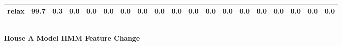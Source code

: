 \documentclass{article}
\begin{document}
\begin{sideways}
\begin{tabular}{lrrrrrrrrrrrrrrrrrr}
relax                         &        99.7 &                0.3 &           0.0 &                          0.0 &                0.0 &                0.0 &                        0.0 &          0.0 &              0.0 &                0.0 &                    0.0 &                      0.0 &                  0.0 &                   0.0 &              0.0 &              0.0 &                                  0.0 &          0.0 \\
\bottomrule
\end{tabular}
\end{sideways}
\normalsize
\vspace{1cm}\\
\textbf{House A Model HMM Feature Change}\\
\vspace{1cm}\\
\end{document}

